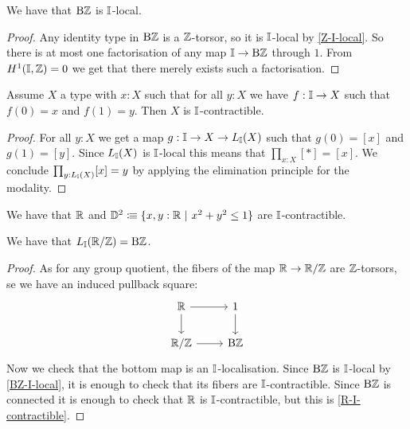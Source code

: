 \begin{lemma}\label{BZ-I-local}
We have that $\mathrm{B}\mathbb{Z}$ is $\mathbb{I}$-local.
\end{lemma}

\begin{proof}
Any identity type in $\mathrm{B}\mathbb{Z}$ is a $\mathbb{Z}$-torsor, so it is $\mathbb{I}$-local by \cref{Z-I-local}. So there is at most one factorisation of any map $\mathbb{I}\to \mathrm{B}\mathbb{Z}$ through $1$. From $H^1(\mathbb{I},\mathbb{Z})=0$ we get that there merely exists such a factorisation.
\end{proof}

\begin{lemma}\label{continuously-path-connected-contractible}
Assume $X$ a type with $x:X$ such that for all $y:X$ we have $f:\mathbb{I}\to X$ such that $f(0)=x$ and $f(1)=y$. Then $X$ is $\mathbb{I}$-contractible.
\end{lemma}

\begin{proof}
For all $y:X$ we get a map $g:\mathbb{I}\to X\to L_{\mathbb{I}}(X)$ such that $g(0) = [x]$ and $g(1)=[y]$. Since $L_{\mathbb{I}}(X)$ is $\mathbb{I}$-local this means that $\prod_{x:X}[*]=[x]$. We conclude $\prod_{y:L_{\mathbb{I}}(X)}[x]=y$ by applying the elimination principle for the modality.
\end{proof}

\begin{corollary}\label{R-I-contractible}
We have that $\mathbb{R}$ and $\mathbb{D}^2\colonequiv\{x,y:\mathbb R\ \vert\ x^2+y^2\leq 1\}$ are $\mathbb{I}$-contractible.
\end{corollary}

\begin{proposition}\label{shape-S1-is-BZ}
We have that $L_{\mathbb{I}}(\mathbb{R}/\mathbb{Z}) = \mathrm{B}\mathbb{Z}$.
\end{proposition}

\begin{proof}
As for any group quotient, the fibers of the map $\mathbb{R}\to\mathbb{R}/\mathbb{Z}$ are $\mathbb{Z}$-torsors, se we have an induced pullback square:
\[
\begin{tikzcd}
\R\ar[r]\ar[d] & 1\ar[d] \\
\R/\Z\ar[r] & \B\Z
\end{tikzcd}
\]
Now we check that the bottom map is an $\mathbb{I}$-localisation. Since $\mathrm{B}\mathbb{Z}$ is $\mathbb{I}$-local by \cref{BZ-I-local}, it is enough to check that its fibers are $\mathbb{I}$-contractible. Since $\mathrm{B}\mathbb{Z}$ is connected it is enough to check that $\mathbb{R}$ is $\mathbb{I}$-contractible, but this is \cref{R-I-contractible}.
\end{proof}

